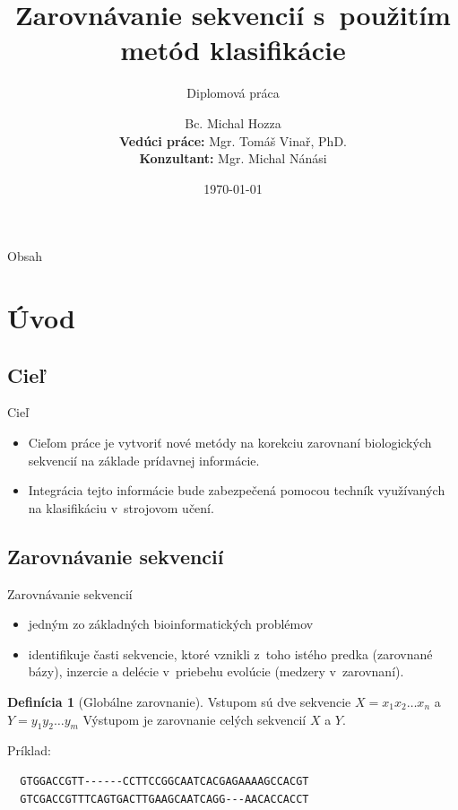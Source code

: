 \documentclass[xcolor=dvipsnames, compress, 12pt]{beamer}
\title{Zarovnávanie sekvencií s~použitím metód klasifikácie}
\subtitle{
\vspace{0.5cm}
\small Diplomová práca
}
\author[Michal Hozza]{\small Bc. Michal Hozza \\ \vspace{1cm} \footnotesize \textbf{Vedúci práce:} Mgr. Tomáš Vinař, PhD. \\ \textbf{Konzultant:} Mgr. Michal Nánási\\ \vspace{.5cm}}
\institute[FMFI UK \insertshortdate]{
  Fakulta matematiky, fyziky a informatiky,
  Univerzita Komenského, Bratislava\\
}
\date[\the\year]{\footnotesize \today}
\theoremstyle{definition}
\newtheorem{df}[vt]{Definícia}
\begin{document}
\begin{frame}[plain]
  \titlepage
\end{frame}


\begin{frame}{Obsah}
  \transdissolve[duration=0.1]
  \tableofcontents
\end{frame}


\section{Úvod}

\subsection{Cieľ}
\begin{frame}{Cieľ}
  \begin{itemize}
  \item Cieľom práce je vytvoriť nové metódy na korekciu zarovnaní biologických sekvencií na základe prídavnej informácie.
  \item Integrácia tejto informácie bude zabezpečená pomocou techník využívaných na klasifikáciu v~strojovom učení.
  \end{itemize}
\end{frame}

\subsection{Zarovnávanie sekvencií}
\begin{frame}[fragile]{Zarovnávanie sekvencií}
  \begin{itemize}
      \item jedným zo základných bioinformatických problémov
      \item identifikuje časti sekvencie, ktoré vznikli z~toho istého predka (zarovnané bázy), inzercie a delécie v~priebehu evolúcie (medzery v~zarovnaní).
  \end{itemize}
\pause
\begin{df}[Globálne zarovnanie]
Vstupom sú dve sekvencie $X = x_1x_2\dots x_n$ a $Y = y_1y_2\dots y_m$
Výstupom je zarovnanie celých sekvencií $X$ a $Y$.
\end{df}
\pause
Príklad:
      \begin{verbatim}
  GTGGACCGTT------CCTTCCGGCAATCACGAGAAAAGCCACGT
  GTCGACCGTTTCAGTGACTTGAAGCAATCAGG---AACACCACCT
      \end{verbatim}
\end{frame}
\end{document}
